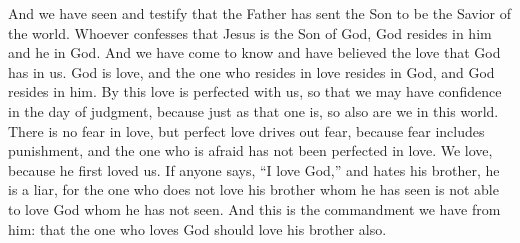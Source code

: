 \begin{biblechapter}
\verse And we have seen and testify that the Father has sent the Son to be the Savior of the world.
\verse Whoever confesses that Jesus is the Son of God, God resides in him and he in God.
\verse And we have come to know and have believed the love that God has in us. God is love, and the one who resides in love resides in God, and God resides in him.
\verse By this love is perfected with us, so that we may have confidence in the day of judgment, because just as that one is, so also are we in this world.
\verse There is no fear in love, but perfect love drives out fear, because fear includes punishment, and the one who is afraid has not been perfected in love.
\verse We love, because he first loved us.
\verse If anyone says, “I love God,” and hates his brother, he is a liar, for the one who does not love his brother whom he has seen is not able to love God whom he has not seen.
\verse And this is the commandment we have from him: that the one who loves God should love his brother also.
\end{biblechapter}

